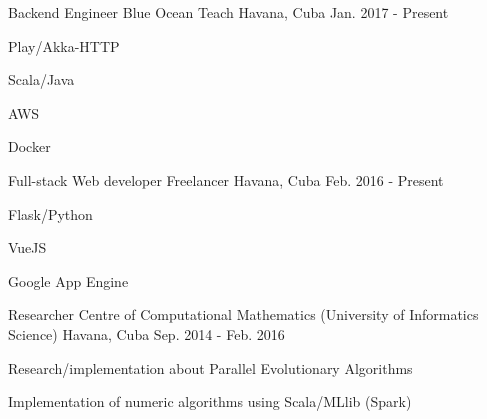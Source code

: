 


\begin{cventries}


\cventry
{Backend Engineer} %
{Blue Ocean Teach} %
{Havana, Cuba} %
{Jan. 2017 - Present} %
{ %
\begin{cvitems}
\item {Play/Akka-HTTP}
\item {Scala/Java}
\item {AWS}
\item {Docker}
\end{cvitems}
}


\cventry
{Full-stack Web developer} %
{Freelancer} %
{Havana, Cuba} %
{Feb. 2016 - Present} %
{ %
\begin{cvitems}
\item {Flask/Python}
\item {VueJS}
\item {Google App Engine}
\end{cvitems}
}


\cventry
{Researcher} %
{Centre of Computational Mathematics (University of Informatics Science)} %
{Havana, Cuba} %
{Sep. 2014 - Feb. 2016} %
{ %
\begin{cvitems}
\item {Research/implementation about Parallel Evolutionary Algorithms}
\item {Implementation of numeric algorithms using Scala/MLlib (Spark)}
\end{cvitems}
}



\end{cventries}
